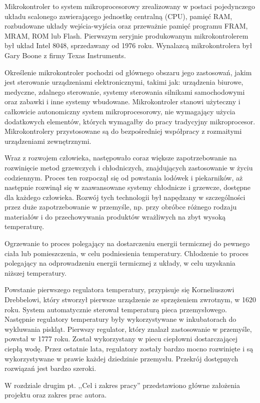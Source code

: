 Mikrokontroler to system mikroprocesorowy zrealizowany w postaci pojedynczego układu scalonego zawierającego jednostkę centralną (CPU), pamięć RAM, rozbudowane układy wejścia-wyjścia oraz przeważnie pamięć programu FRAM, MRAM, ROM lub Flash. Pierwszym seryjnie produkowanym mikrokontrolerem był układ Intel 8048, sprzedawany od 1976 roku. Wynalazcą mikrokontrolera był Gary Boone z firmy Texas Instruments.

Określenie mikrokontroler pochodzi od głównego obszaru jego zastosowań, jakim jest sterowanie urządzeniami elektronicznymi, takimi jak: urządzenia biurowe, medyczne, zdalnego sterowanie, systemy sterowania silnikami samochodowymi oraz zabawki i inne systemy wbudowane. Mikrokontroler stanowi użyteczny i całkowicie autonomiczny system mikroprocesorowy, nie wymagający użycia dodatkowych elementów, których wymagałby do pracy tradycyjny mikroprocesor. Mikrokontrolery przystosowane są do bezpośredniej współpracy z rozmaitymi urządzeniami zewnętrznymi.

Wraz z rozwojem człowieka, następowało coraz większe zapotrzebowanie na rozwinięcie metod grzewczych i chłodniczych, znajdujących zastosowanie w życiu codziennym. Proces ten rozpoczął się od powstania lodówek i piekarników, aż następnie rozwinął się w zaawansowane systemy chłodnicze i grzewcze, dostępne dla każdego człowieka. Rozwój tych technologii był napędzany w szczególności przez duże zapotrzebowanie w przemyśle, np. przy obróbce różnego rodzaju materiałów i do przechowywania produktów wrażliwych na zbyt wysoką temperaturę.

Ogrzewanie to proces polegający na dostarczeniu energii termicznej do pewnego ciała lub pomieszczenia, w celu podniesienia temperatury. Chłodzenie to proces polegający na odprowadzeniu energii termicznej z układy, w celu uzyskania niższej temperatury.

Powstanie pierwszego regulatora temperatury, przypisuje się Korneliuszowi Drebbelowi, który stworzył pierwsze urządzenie ze sprzężeniem zwrotnym, w 1620 roku. System automatycznie sterował temperaturą pieca przemysłowego. Następnie regulatory temperatury były wykorzystywane w inkubatorach do wykluwania piskląt. Pierwszy regulator, który znalazł zastosowanie w przemyśle, powstał w 1777 roku. Został wykorzystany w piecu ciepłowni dostarczającej ciepłą wodę.
Przez ostatnie lata, regulatory zostały bardzo mocno rozwinięte i są wykorzystywane w prawie każdej dziedzinie przemysłu. Przekrój dostępnych rozwiązań jest bardzo szeroki.

W rozdziale drugim pt. ,,Cel i zakres pracy'' przedstawiono główne założenia projektu oraz zakres prac autora.

